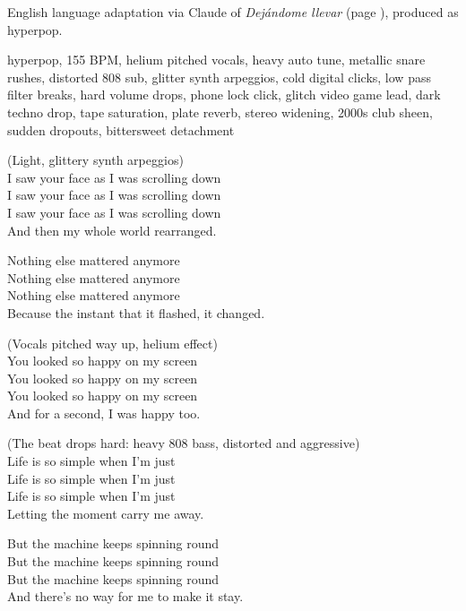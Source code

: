 
\begin{notes}
English language adaptation via Claude of \emph{Dejándome llevar} (page \pageref{sec:dejandome-llevar}), produced as hyperpop.
\end{notes}
\begin{style}
hyperpop, 155 BPM, helium pitched vocals, heavy auto tune, metallic snare rushes, distorted 808 sub, glitter synth arpeggios, cold digital clicks, low pass filter breaks, hard volume drops, phone lock click, glitch video game lead, dark techno drop, tape saturation, plate reverb, stereo widening, 2000s club sheen, sudden dropouts, bittersweet detachment
\end{style}
\begin{lyrics}
(Light, glittery synth arpeggios)\\
I saw your face as I was scrolling down\\
I saw your face as I was scrolling down\\
I saw your face as I was scrolling down\\
And then my whole world rearranged.

Nothing else mattered anymore\\
Nothing else mattered anymore\\
Nothing else mattered anymore\\
Because the instant that it flashed, it changed.

(Vocals pitched way up, helium effect)\\
You looked so happy on my screen\\
You looked so happy on my screen\\
You looked so happy on my screen\\
And for a second, I was happy too.

(The beat drops hard: heavy 808 bass, distorted and aggressive)\\
Life is so simple when I’m just\\
Life is so simple when I’m just\\
Life is so simple when I’m just\\
Letting the moment carry me away.

But the machine keeps spinning round\\
But the machine keeps spinning round\\
But the machine keeps spinning round\\
And there’s no way for me to make it stay.


\end{lyrics}
